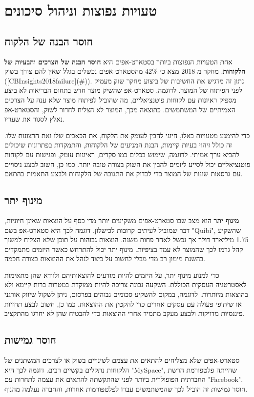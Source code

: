 \chapter{טעויות נפוצות וניהול סיכונים}

\section{חוסר הבנה של הלקוח}
אחת הטעויות הנפוצות ביותר בסטארט-אפים היא \textbf{חוסר הבנה של הצרכים והבעיות של הלקוחות}. מחקר מ-2018 מצא כי 42\% מהסטארט-אפים נכשלים בגלל שאין להם צורך בשוק ([CBInsights2018failure](\#)). נתון זה מדגיש את החשיבות של ביצוע מחקר שוק מעמיק לפני הפיתוח של המוצר. לדוגמה, סטארט-אפ שהשיק מוצר חדש בתחום הבריאות לא ביצע מספיק ראיונות עם לקוחות פוטנציאליים, מה שהוביל לפיתוח מוצר שלא ענה על הצרכים האמיתיים של המשתמשים. כתוצאה מכך, המוצר לא הצליח לחדור לשוק, והסטארט-אפ נאלץ לסגור את שעריו.

כדי להימנע מטעויות כאלו, חיוני להבין לעומק את הלקוח, את הכאבים שלו ואת הרצונות שלו. זה כולל זיהוי בעיות קיימות, הבנת המניעים של הלקוחות, והתמקדות בפתרונות שיכולים להביא ערך אמיתי. לדוגמה, שימוש בכלים כמו סקרים, ראיונות עומק, ופגישות עם לקוחות פוטנציאליים יכול לסייע ליזמים להבין את השוק בצורה טובה יותר. כמו כן, חשוב לבצע ניסויים עם גרסאות שונות של המוצר כדי לבדוק את התגובה של הלקוחות ולבצע התאמות בהתאם.

\section{מינוף יתר}
\textbf{מינוף יתר} הוא מצב שבו סטארט-אפים משקיעים יותר מדי כסף על הוצאות שאינן חיוניות, דבר שמוביל לעיתים קרובות לכישלון. דוגמה לכך היא סטארט-אפ בשם "Quibi", שהשקיע 1.75 מיליארד דולר אך נכשל לאחר פחות משנה. הוצאות גבוהות על תוכן שלא הצליח למשוך קהל גרמו לכך שהמוצר לא עמד בציפיות. מינוף יתר יכול להתרחש כאשר היזמים מתמקדים בהשגת מימון רב מדי מבלי לחשוב על כיצד לנהל את ההוצאות בצורה חכמה.

כדי למנוע מינוף יתר, על היזמים להיות מודעים להוצאותיהם ולוודא שהן מתאימות לאסטרטגיה העסקית הכוללת. השקעה נבונה צריכה להיות ממוקדת במטרות ברות קיימא ולא בהוצאות מיותרות. לדוגמה, במקום להשקיע סכומים גבוהים בפרסום, ניתן לשקול שיווק אורגני או שיתופי פעולה עם עסקים אחרים כדי להקטין את ההוצאות. כמו כן, חשוב לבצע תחזיות פיננסיות מדויקות ולבצע מעקב מתמיד אחרי ההוצאות כדי להבטיח שהן לא יחרגו מהתקציב.

\section{חוסר גמישות}
סטארט-אפים שלא מצליחים להתאים את עצמם לשינויים בשוק או לצרכים המשתנים של הלקוחות נתקלים בקשיים רבים. דוגמה לכך היא "MySpace", שהייתה פלטפורמת הרשת החברתית הפופולרית ביותר לפני שהתקשתה להתאים את עצמה לתחרות עם "Facebook". חוסר גמישות זה הוביל לכך שהמשתמשים עברו לפלטפורמות אחרות, והחברה נעלמה מהנוף.

